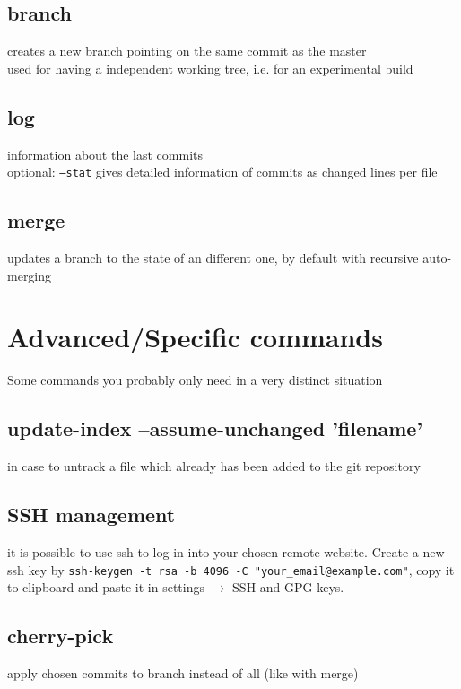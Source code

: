 \subsection*{branch}
creates a new branch pointing on the same commit as the master\\
used for having a independent working tree, i.e. for an experimental build\\

\subsection*{log}
information about the last commits \\
optional: \texttt{---stat} gives detailed information of commits as changed lines per file \\

\subsection*{merge}
updates a branch to the state of an different one, by default with recursive auto-merging\\


\section*{Advanced/Specific commands}
Some commands you probably only need in a very distinct situation\\
\subsection*{update-index –assume-unchanged 'filename'}
in case to untrack a file which already has been added to the git repository\\

\subsection*{SSH management}
it is possible to use ssh to log in into your chosen remote website. Create a new ssh key by \texttt{ssh-keygen -t rsa -b 4096 -C "your\_email@example.com"}, copy it to clipboard and paste it in settings $\rightarrow$ SSH and GPG keys.\\

\subsection*{cherry-pick}
apply chosen commits to branch instead of all (like with merge)\\

